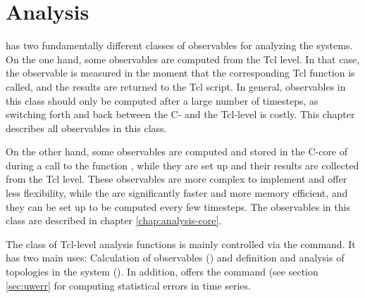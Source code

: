 %  
%   
%  
%  
%
\chapter{Analysis}
\label{chap:analysis}


\es has two fundamentally different classes of observables for
analyzing the systems.  On the one hand, some observables are
computed from the Tcl level. In that case, the observable is measured
in the moment that the corresponding Tcl function is called, and the
results are returned to the Tcl script. In general, observables in
this class should only be computed after a large number of timesteps,
as switching forth and back between the C- and the Tcl-level is
costly. This chapter describes all observables in this class.

On the other hand, some observables are computed and stored in the
C-core of \es during a call to the function , while
they are set up and their results are collected from the Tcl level.
These observables are more complex to implement and offer less
flexibility, while the are significantly faster and more memory
efficient, and they can be set up to be computed every few
timesteps. The observables in this class are described in chapter
\ref{chap:analysis-core}.

The class of Tcl-level analysis functions is mainly controlled via the
 command. It has two main uses: Calculation of
observables () and definition and
analysis of topologies in the system ().  In addition, \es offers the command 
(see section \ref{sec:uwerr} for computing statistical errors in time
series.

